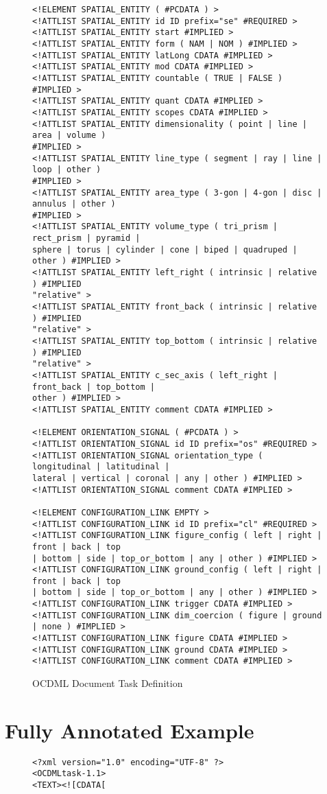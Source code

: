 \documentclass[11pt]{article}
\begin{document}
\begin{appendix}
\begin{figure*}[h]
\begin{verbatim}
<!ELEMENT SPATIAL_ENTITY ( #PCDATA ) >
<!ATTLIST SPATIAL_ENTITY id ID prefix="se" #REQUIRED >
<!ATTLIST SPATIAL_ENTITY start #IMPLIED >
<!ATTLIST SPATIAL_ENTITY form ( NAM | NOM ) #IMPLIED >
<!ATTLIST SPATIAL_ENTITY latLong CDATA #IMPLIED >
<!ATTLIST SPATIAL_ENTITY mod CDATA #IMPLIED >
<!ATTLIST SPATIAL_ENTITY countable ( TRUE | FALSE ) #IMPLIED >
<!ATTLIST SPATIAL_ENTITY quant CDATA #IMPLIED >
<!ATTLIST SPATIAL_ENTITY scopes CDATA #IMPLIED >
<!ATTLIST SPATIAL_ENTITY dimensionality ( point | line | area | volume ) 
#IMPLIED >
<!ATTLIST SPATIAL_ENTITY line_type ( segment | ray | line | loop | other ) 
#IMPLIED >
<!ATTLIST SPATIAL_ENTITY area_type ( 3-gon | 4-gon | disc | annulus | other ) 
#IMPLIED >
<!ATTLIST SPATIAL_ENTITY volume_type ( tri_prism | rect_prism | pyramid | 
sphere | torus | cylinder | cone | biped | quadruped | other ) #IMPLIED >
<!ATTLIST SPATIAL_ENTITY left_right ( intrinsic | relative ) #IMPLIED 
"relative" >
<!ATTLIST SPATIAL_ENTITY front_back ( intrinsic | relative ) #IMPLIED 
"relative" >
<!ATTLIST SPATIAL_ENTITY top_bottom ( intrinsic | relative ) #IMPLIED 
"relative" >
<!ATTLIST SPATIAL_ENTITY c_sec_axis ( left_right | front_back | top_bottom | 
other ) #IMPLIED >
<!ATTLIST SPATIAL_ENTITY comment CDATA #IMPLIED >

<!ELEMENT ORIENTATION_SIGNAL ( #PCDATA ) >
<!ATTLIST ORIENTATION_SIGNAL id ID prefix="os" #REQUIRED >
<!ATTLIST ORIENTATION_SIGNAL orientation_type ( longitudinal | latitudinal | 
lateral | vertical | coronal | any | other ) #IMPLIED >
<!ATTLIST ORIENTATION_SIGNAL comment CDATA #IMPLIED >

<!ELEMENT CONFIGURATION_LINK EMPTY >
<!ATTLIST CONFIGURATION_LINK id ID prefix="cl" #REQUIRED >
<!ATTLIST CONFIGURATION_LINK figure_config ( left | right | front | back | top 
| bottom | side | top_or_bottom | any | other ) #IMPLIED >
<!ATTLIST CONFIGURATION_LINK ground_config ( left | right | front | back | top 
| bottom | side | top_or_bottom | any | other ) #IMPLIED >
<!ATTLIST CONFIGURATION_LINK trigger CDATA #IMPLIED >
<!ATTLIST CONFIGURATION_LINK dim_coercion ( figure | ground | none ) #IMPLIED >
<!ATTLIST CONFIGURATION_LINK figure CDATA #IMPLIED >
<!ATTLIST CONFIGURATION_LINK ground CDATA #IMPLIED >
<!ATTLIST CONFIGURATION_LINK comment CDATA #IMPLIED >
        \end{verbatim}
        \caption{OCDML Document Task Definition}
        \label{fig:dtd}
    \end{figure*}
    
    \clearpage
    \section{Fully Annotated Example} %
    \label{sec:fully_annotated_example}
    \begin{figure}
        \begin{verbatim}
<?xml version="1.0" encoding="UTF-8" ?>
<OCDMLtask-1.1>
<TEXT><![CDATA[


\end{verbatim}
\end{figure}
\end{appendix}
\end{document}
